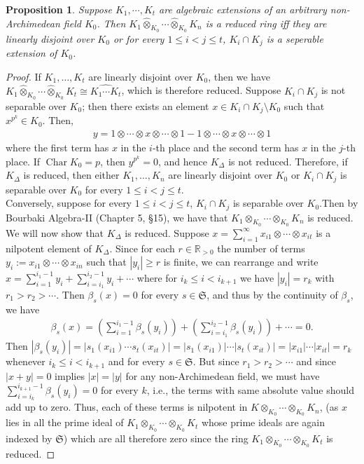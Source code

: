 \documentclass[12pts,a4paper]{amsart}
\newtheorem{proposition}{Proposition}[section]
\DeclareMathOperator{\Char}{Char}
\begin{document}
\begin{proposition}
	Suppose $K_1,\cdots,K_t$ are algebraic extensions of an arbitrary non-Archimedean field $K_0$. Then $K_1\hat{\otimes}_{K_0}\cdots\hat{\otimes}_{K_0}K_n$ is a reduced ring iff they are linearly disjoint over $K_0$ or for every $1\leq i<j\leq t$, $K_i\cap K_j$ is a seperable extension of $K_0$.
\end{proposition}

\begin{proof}
	If $K_1,\dots, K_t$ are linearly disjoint over $K_0$, then we have $K_1\hat{\otimes}_{K_0}\cdots\hat{\otimes}_{K_0}K_t \cong \widehat{K_1\cdots K_t}$, which is therefore reduced. Suppose $K_i\cap K_j$ is not separable over $K_0$; then there exists an element $x\in K_i\cap K_j\setminus K_0$ such that $x^{p^k}\in K_0$. Then,
	\begin{align*}
		y=1\otimes\cdots\otimes x\otimes\cdots\otimes 1-1\otimes\cdots\otimes x\otimes\cdots\otimes 1
	\end{align*}
	where the first term has $x$ in the $i$-th place and the second term has $x$ in the $j$-th place. If $\Char K_0=p$, then $y^{p^k}=0$, and hence $K_\Delta$ is not reduced. Therefore, if $K_\Delta$ is reduced, then either $K_1,\dots,K_n$ are linearly disjoint over $K_0$ or $K_i\cap K_j$ is separable over $K_0$ for every $1\leq i<j\leq t$.\\
    
    Conversely, suppose for every $1\leq i<j\leq t$, $K_i\cap K_j$ is separable over $K_0$.Then by Bourbaki Algebra-II\cite{Bou} (Chapter 5, \S 15), we have that $K_1\otimes_{K_0}\cdots\otimes_{K_0}K_n$ is reduced. We will now show that $K_\Delta$ is reduced. Suppose $x=\sum\limits_{i=1}^\infty x_{i1}\otimes\cdots\otimes x_{it}$ is a nilpotent element of $K_\Delta$. Since for each $r\in\mathbb{R}_{>0}$ the number of terms $y_i:=x_{i1}\otimes\cdots \otimes x_{in}$ such that $|y_i|\geq r$ is finite, we can rearrange and write $x=\sum\limits_{i=1}^{i_1-1}y_i+\sum\limits_{i=i_1}^{i_2-1}y_i+\cdots$ where for $i_k\leq i<i_{k+1}$ we have $|y_i|=r_k$ with $r_1>r_2>\cdots$. Then $\beta_s(x)=0$ for every $s\in\mathfrak{S}$, and thus by the continuity of $\beta_s$, we have
	\begin{align*}
		\beta_s(x)=\left(\sum\limits_{i=1}^{i_1-1}\beta_s(y_i)\right)+\left(\sum\limits_{i=i_1}^{i_2-1}\beta_s(y_i)\right)+\cdots=0.
	\end{align*}
	Then $|\beta_s(y_i)|=|s_1(x_{i1})\cdots s_t(x_{it})|=|s_1(x_{i1})|\cdots |s_t(x_{it})|=|x_{i1}|\cdots|x_{it}|=r_k$ whenever $i_k\leq i<i_{k+1}$ and for every $s\in\mathfrak{S}$. But since $r_1>r_2>\cdots$ and since $|x+y|=0$ implies $|x|=|y|$ for any non-Archimedean field, we must have $\sum\limits_{i=i_k}^{i_{k+1}-1}\beta_s(y_i)=0$ for every $k$, i.e., the terms with same absolute value should add up to zero. Thus, each of these terms is nilpotent in $K\otimes_{K_0}\cdots\otimes_{K_0}K_n$, (as $x$ lies in all the prime ideal of $K_1\otimes_{K_0}\cdots\otimes_{K_0} K_t$ whose prime ideals are again indexed by $\mathfrak{S}$) which are all therefore zero since the ring $K_1\otimes_{K_0}\cdots\otimes_{K_0} K_t$ is reduced.
\end{proof}
\end{document}
